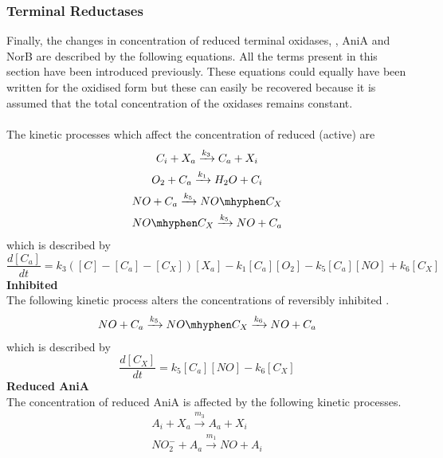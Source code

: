 \subsubsection{Terminal Reductases}
Finally, the changes in concentration of reduced terminal oxidases, \cbbthree{}, AniA and NorB are described by the following equations. All the terms present in this section have been introduced previously. These equations could equally have been written for the oxidised form but these can easily be recovered because it is assumed that the total concentration of the oxidases remains constant.\\
\clearpage
{}\\
The kinetic processes which affect the concentration of reduced (active) \cbbthree{} are
\begin{equation*}
\begin{gathered}
C_i + X_a \xrightarrow{k_3} C_a + X_i\\
O_2 + C_a\xrightarrow{k_1} H_{2}O + C_i\\
NO + C_a \xrightarrow{k_5} NO\mhyphen C_X\\
NO\mhyphen C_X \xrightarrow{k_5} NO + C_a
\end{gathered}
\end{equation*}
which is described by
\begin{equation}
\frac{d[C_a]}{dt} = k_3([C] - [C_a] - [C_X])[X_a] - k_{1}[C_a][O_2] - k_5[C_a][NO] + k_6[C_X]
\label{eq:active_cbb3}
\end{equation}
{\bf Inhibited \cbbthree{}}\\
The following kinetic process alters the concentrations of reversibly inhibited \cbbthree{}.
\begin{equation*}
\begin{gathered}
 NO + C_a \xrightarrow{k_5} NO\mhyphen C_X \xrightarrow{k_6} NO + C_a
\end{gathered}
\end{equation*}
which is described by
\begin{equation}
\frac{d[C_X]}{dt} = k_5[C_a][NO] - k_6 [C_X]
\label{eq:NO inhibited_cbb3}
\end{equation}
{\bf Reduced AniA}\\
The concentration of reduced AniA is affected by the following kinetic processes.
\begin{equation*}
\begin{gathered}
A_i + X_a \xrightarrow{m_3} A_a + X_i \\
NO_2^- + A_a \xrightarrow{m_1} NO + A_i
\end{gathered}
\end{equation*}
